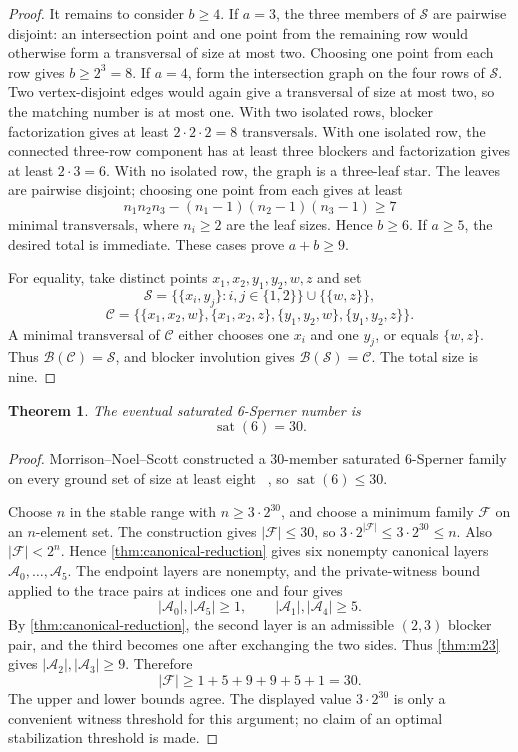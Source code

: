\documentclass[11pt]{article}
\newtheorem{theorem}{Theorem}[section]
\theoremstyle{definition}
\theoremstyle{remark}
\newcommand{\family}{\mathcal{F}}
\newcommand{\sat}{\operatorname{sat}}
\newcommand{\blocker}{\mathcal{B}}
\begin{document}
\begin{proof}
It remains to consider $b\geq4$.  If $a=3$, the three members of
$\mathcal S$ are pairwise disjoint: an intersection point and one point from
the remaining row would otherwise form a transversal of size at most two.
Choosing one point from each row gives $b\geq2^3=8$.  If $a=4$, form the
intersection graph on the four rows of $\mathcal S$.  Two vertex-disjoint
edges would again give a transversal of size at most two, so the matching
number is at most one.  With two isolated rows, blocker factorization gives at
least $2\cdot2\cdot2=8$ transversals.  With one isolated row, the connected
three-row component has at least three blockers and factorization gives at
least $2\cdot3=6$.  With no isolated row, the graph is a three-leaf star.
The leaves are pairwise disjoint; choosing one point from each gives at least
\[
  n_1n_2n_3-(n_1-1)(n_2-1)(n_3-1)\geq7
\]
minimal transversals, where $n_i\geq2$ are the leaf sizes.  Hence $b\geq6$.
If $a\geq5$, the desired total is immediate.  These cases prove
$a+b\geq9$.

For equality, take distinct points $x_1,x_2,y_1,y_2,w,z$ and set
\[
  \mathcal S=\{\{x_i,y_j\}:i,j\in\{1,2\}\}\cup\{\{w,z\}\},
\]
\[
  \mathcal C=\{\{x_1,x_2,w\},\{x_1,x_2,z\},
  \{y_1,y_2,w\},\{y_1,y_2,z\}\}.
\]
A minimal transversal of $\mathcal C$ either chooses one $x_i$ and one
$y_j$, or equals $\{w,z\}$.  Thus
$\blocker(\mathcal C)=\mathcal S$, and blocker involution gives
$\blocker(\mathcal S)=\mathcal C$.  The total size is nine.
\end{proof}

\begin{theorem}
\label{thm:sat6}
The eventual saturated 6-Sperner number is
\[
  \sat(6)=30.
\]
\end{theorem}

\begin{proof}
Morrison--Noel--Scott constructed a 30-member saturated 6-Sperner family on
every ground set of size at least eight~
\cite[Proposition~20]{mns2014}, so $\sat(6)\leq30$.

Choose $n$ in the stable range with $n\geq3\cdot2^{30}$, and choose a minimum
family $\family$ on an $n$-element set.  The construction gives
$|\family|\leq30$, so
$3\cdot2^{|\family|}\leq3\cdot2^{30}\leq n$.  Also
$|\family|<2^n$.  Hence \cref{thm:canonical-reduction} gives six nonempty
canonical layers $\mathcal A_0,\ldots,\mathcal A_5$.  The endpoint layers
are nonempty, and the private-witness bound applied to the trace pairs at
indices one and four gives
\[
  |\mathcal A_0|,|\mathcal A_5|\geq1,\qquad
  |\mathcal A_1|,|\mathcal A_4|\geq5.
\]
By \cref{thm:canonical-reduction}, the second layer is an admissible
$(2,3)$ blocker pair, and the third becomes one after exchanging the two
sides.  Thus \cref{thm:m23} gives
$|\mathcal A_2|,|\mathcal A_3|\geq9$.  Therefore
\[
  |\family|\geq1+5+9+9+5+1=30.
\]
The upper and lower bounds agree.
The displayed value $3\cdot2^{30}$ is only a convenient witness threshold
for this argument; no claim of an optimal stabilization threshold is made.
\end{proof}
\end{document}
